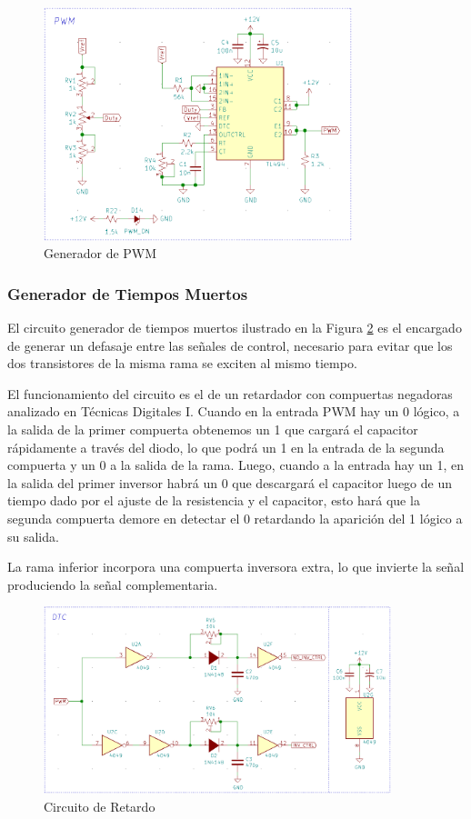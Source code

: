 \documentclass[11pt, a4paper]{article}
\begin{document}
\begin{figure}[h]
	\centering
	\includegraphics[width=0.8\textwidth]{Imagenes/circ_pwm.png}
	\caption{Generador de PWM}
	\label{fig:circ_pwm}
\end{figure} 


 \subsubsection{Generador de Tiempos Muertos}

El circuito generador de tiempos muertos ilustrado en la Figura \ref{fig:circ_retardo} es el encargado de generar un defasaje entre las señales de control, necesario para evitar que los dos transistores de la misma rama se exciten al mismo tiempo. 


El funcionamiento del circuito es el de un retardador con compuertas negadoras analizado en Técnicas Digitales I. Cuando en la entrada PWM hay un 0 lógico, a la salida de la primer compuerta obtenemos un 1 que cargará el capacitor rápidamente a través del diodo, lo que podrá un 1 en la entrada de la segunda compuerta y un 0 a la salida de la rama. Luego, cuando a la entrada hay un 1, en la salida del primer inversor habrá un 0 que descargará el capacitor luego de un tiempo dado por el ajuste de la resistencia y el capacitor, esto hará que la segunda compuerta demore en detectar el 0 retardando la aparición del 1 lógico a su salida.

La rama inferior incorpora una compuerta inversora extra, lo que invierte la señal produciendo la señal complementaria.

\begin{figure}[h]
	\centering
	\includegraphics[width=0.9\textwidth]{Imagenes/circ_retardo.png}
	\caption{Circuito de Retardo}
	\label{fig:circ_retardo}
\end{figure} 
\end{document}
